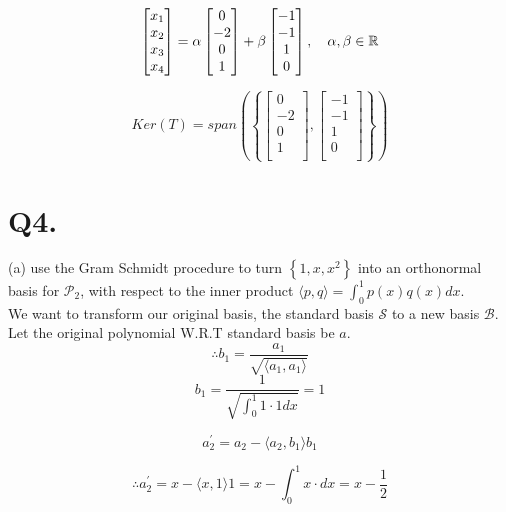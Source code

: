 \documentclass[12pt]{article}
\begin{document}
$$
\begin{bmatrix}
	x_1 \\
	x_2 \\
	x_3 \\
	x_4 \\
\end{bmatrix}
=
\alpha
\begin{bmatrix}
	0 \\
	-2 \\
	0 \\
	1 \\
\end{bmatrix}
+
\beta
\begin{bmatrix}
	-1 \\
	-1 \\
	1 \\
	0 \\
\end{bmatrix}
,
\hspace{10px}
\alpha, \beta \in \mathbb{R}
$$

$$
Ker(T)= span
\left(
\left\lbrace
\begin{bmatrix}
	0 \\
	-2 \\
	0 \\
	1 \\
\end{bmatrix},
\begin{bmatrix}
	-1 \\
	-1 \\
	1 \\
	0 \\
\end{bmatrix}
\right\rbrace
\right)
$$

\section*{Q4.}
(a) use the Gram Schmidt procedure to turn $\left\lbrace 1, x, x^2 \right\rbrace$ into an orthonormal basis for $\mathcal{P}_2$, with respect to the inner product $\langle p, q \rangle = \int_{0}^{1}p(x)q(x)dx$.\\
\medskip
We want to transform our original basis, the standard basis $\mathcal{S}$ to a new basis $\mathcal{B}$.
Let the original polynomial W.R.T standard basis be $a$.
$$
\therefore b_1=\frac{a_1}{\sqrt{\langle a_1, a_1 \rangle}}
$$
$$
b_1=
\frac{1}{\sqrt{\int_{0}^{1}1\cdot 1dx}}
=1
$$

$$
a_{2}^{'}=a_2-\langle a_2, b_1 \rangle b_1 
$$

$$
\therefore
a_{2}^{'}=x- \langle x, 1 \rangle 1 = x - \int_{0}^{1}x\cdot dx=x-\frac{1}{2}
$$
\end{document}
